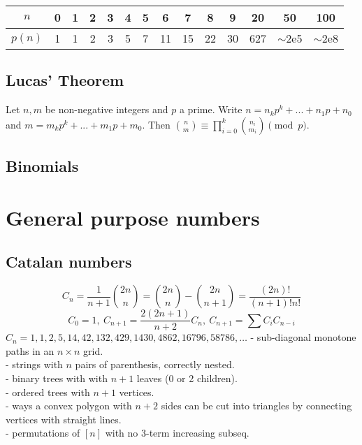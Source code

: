     \begin{center}
    \begin{tabular}{c|c@{\ }c@{\ }c@{\ }c@{\ }c@{\ }c@{\ }c@{\ }c@{\ }c@{\ }c@{\ }c@{\ }c@{\ }c}
      $n$    & 0 & 1 & 2 & 3 & 4 & 5 & 6  & 7  & 8  & 9  & 20  & 50  & 100 \\ \hline
      $p(n)$ & 1 & 1 & 2 & 3 & 5 & 7 & 11 & 15 & 22 & 30 & 627 & $\mathtt{\sim}$2e5 & $\mathtt{\sim}$2e8 \\
    \end{tabular}
    \end{center}

  \subsection{Lucas' Theorem}
    Let $n,m$ be non-negative integers and $p$ a prime. Write $n=n_kp^k+...+n_1p+n_0$ and $m=m_kp^k+...+m_1p+m_0$. Then $\binom{n}{m} \equiv \prod_{i=0}^k\binom{n_i}{m_i} \pmod{p}$.

  \subsection{Binomials}

\section{General purpose numbers}
  \subsection{Catalan numbers}
    \[ C_n=\frac{1}{n+1}\binom{2n}{n}= \binom{2n}{n}-\binom{2n}{n+1} = \frac{(2n)!}{(n+1)!n!} \]
    \[ C_0=1,\ C_{n+1} = \frac{2(2n+1)}{n+2}C_n,\ C_{n+1}=\sum C_iC_{n-i} \]
    ${C_n = 1, 1, 2, 5, 14, 42, 132, 429, 1430, 4862, 16796, 58786, \dots}$
    - sub-diagonal monotone paths in an $n\times n$ grid.                                                           \\
    - strings with $n$ pairs of parenthesis, correctly nested.                                                      \\
    - binary trees with with $n+1$ leaves (0 or 2 children).                                                        \\
    - ordered trees with $n+1$ vertices.                                                                            \\
    - ways a convex polygon with $n+2$ sides can be cut into triangles by connecting vertices with straight lines.  \\
    - permutations of $[n]$ with no 3-term increasing subseq.

